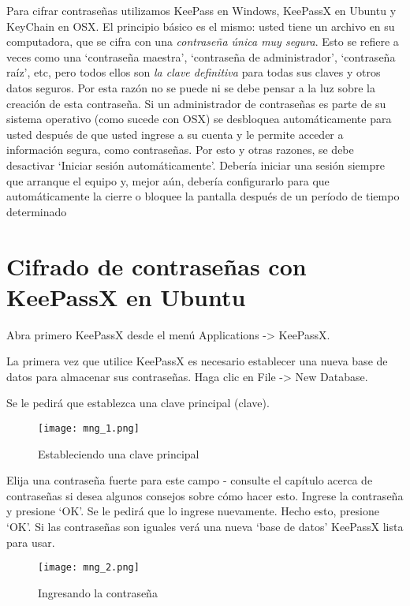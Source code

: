 \documentclass[10pt,a5paper,twoside,,]{book}
\begin{document}
Para cifrar contraseñas utilizamos KeePass en Windows, KeePassX en
Ubuntu y KeyChain en OSX. El principio básico es el mismo: usted tiene
un archivo en su computadora, que se cifra con una \emph{contraseña
única muy segura}. Esto se refiere a veces como una `contraseña
maestra', `contraseña de administrador', `contraseña raíz', etc, pero
todos ellos son \emph{la clave definitiva} para todas sus claves y otros
datos seguros. Por esta razón no se puede ni se debe pensar a la luz
sobre la creación de esta contraseña. Si un administrador de contraseñas
es parte de su sistema operativo (como sucede con OSX) se desbloquea
automáticamente para usted después de que usted ingrese a su cuenta y le
permite acceder a información segura, como contraseñas. Por esto y otras
razones, se debe desactivar `Iniciar sesión automáticamente'. Debería
iniciar una sesión siempre que arranque el equipo y, mejor aún, debería
configurarlo para que automáticamente la cierre o bloquee la pantalla
después de un período de tiempo determinado

\section{Cifrado de contraseñas con KeePassX en
Ubuntu}\label{cifrado-de-contraseuxf1as-con-keepassx-en-ubuntu}

Abra primero KeePassX desde el menú Applications -\textgreater{}
KeePassX.

La primera vez que utilice KeePassX es necesario establecer una nueva
base de datos para almacenar sus contraseñas. Haga clic en File
-\textgreater{} New Database.

Se le pedirá que establezca una clave principal (clave).

\begin{figure}[htbp]
\centering
\texttt{[image: mng\_1.png]}
\caption{Estableciendo una clave principal}
\end{figure}

Elija una contraseña fuerte para este campo - consulte el capítulo
acerca de contraseñas si desea algunos consejos sobre cómo hacer esto.
Ingrese la contraseña y presione `OK'. Se le pedirá que lo ingrese
nuevamente. Hecho esto, presione `OK'. Si las contraseñas son iguales
verá una nueva `base de datos' KeePassX lista para usar.

\begin{figure}[htbp]
\centering
\texttt{[image: mng\_2.png]}
\caption{Ingresando la contraseña}
\end{figure}
\end{document}
